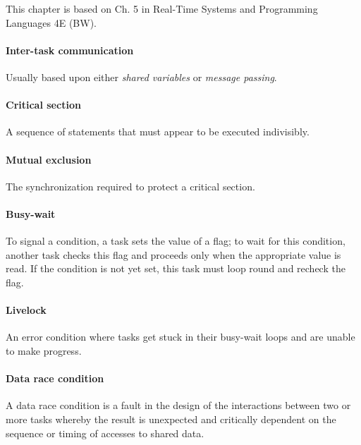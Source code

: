
This chapter is based on Ch. 5 in Real-Time Systems and Programming Languages 4E (BW).

\sepline

\paragraph{Inter-task communication} Usually based upon either \textit{shared variables} or \textit{message passing}.

\paragraph{Critical section} A sequence of statements that must appear to be executed indivisibly.

\paragraph{Mutual exclusion} The synchronization required to protect a critical section.

\paragraph{Busy-wait} To signal a condition, a task sets the value of a flag; to wait for this condition, another task checks this flag and proceeds only when the appropriate value is read. If the condition is not yet set, this task must loop round and recheck the flag.

\paragraph{Livelock} An error condition where tasks get stuck in their busy-wait loops and are unable to make progress.

\paragraph{Data race condition} A data race condition is a fault in the design of the interactions between two or more tasks whereby the result is unexpected and critically dependent on the sequence or timing of accesses to shared data.

